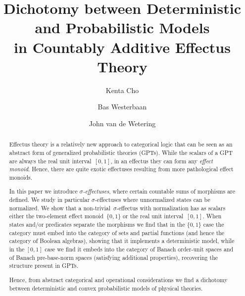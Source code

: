 \documentclass[%
	submission,
copyright,creativecommons,UKenglish]{eptcs}
\title{Dichotomy between Deterministic and Probabilistic Models\\ in Countably Additive Effectus Theory}
\author{Kenta Cho
\institute{National Institute of Informatics, Japan}
\email{cho@nii.ac.jp} \and
    Bas Westerbaan
\institute{University College London}
\email{bas@westerbaan.name} \and
    John van de Wetering
\institute{Radboud Universiteit Nijmegen}
\email{wetering@cs.ru.nl}
}
\begin{document}
\maketitle

\begin{abstract}
Effectus theory is a relatively new approach to categorical logic
that can be seen as an abstract form of generalized probabilistic
theories (GPTs).  While the scalars of a GPT are always the real
unit interval~$[0,1]$, in an effectus they can form any \emph{effect
monoid}. Hence, there are quite exotic effectuses resulting from
more pathological effect monoids.


In this paper we introduce \emph{$\sigma$-effectuses}, where certain
countable sums of morphisms are defined. We study in particular
$\sigma$-effectuses where unnormalized states can be normalized.
We show that a non-trivial~$\sigma$-effectus with normalization
        has as scalars
            either the two-element effect monoid~$\{0,1\}$
            or the real unit interval~$[0,1]$.
When states and/or predicates separate the morphisms we find that in
the $\{0,1\}$ case the category must embed into the category of sets
and partial functions (and hence the category of Boolean algebras),
showing that it implements a deterministic model,
while in the $[0,1]$ case we find it embeds into the category of 
Banach order-unit spaces and of Banach pre-base-norm
spaces (satisfying additional properties), recovering the structure present in GPTs.

Hence, from abstract categorical and operational considerations we find a dichotomy between deterministic and convex probabilistic models of physical theories.
\end{abstract}
\end{document}
